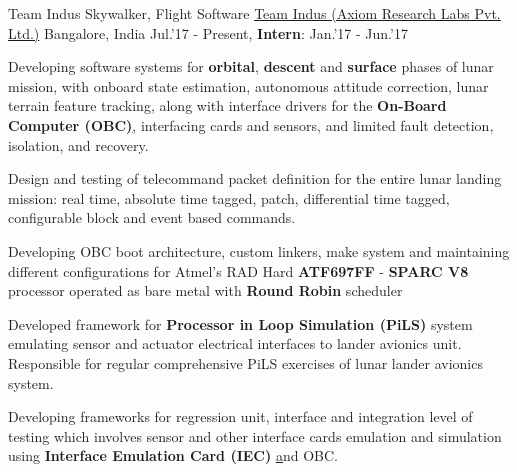 \begin{cventries}
	\cventry
	{Team Indus Skywalker, Flight Software}
	{\href{http://www.teamindus.in/}{Team Indus (Axiom Research Labs Pvt. Ltd.)}}
	{Bangalore, India}
	{Jul.'17 - Present, \textbf{Intern}: Jan.'17 - Jun.'17}
	{
		\begin{cvitems}
		\item{Developing software systems for \textbf{orbital}, \textbf{descent} and \textbf{surface} phases of lunar mission, with onboard state estimation, autonomous attitude correction, lunar terrain feature tracking, along with interface drivers for the \textbf{On-Board Computer (OBC)}\href{http://ww1.microchip.com/downloads/en/DeviceDoc/ATF697FF.pdf}, interfacing cards and sensors, and limited fault detection, isolation, and recovery.}
			\item{Design and testing of telecommand packet definition for the entire lunar landing mission: real time, absolute time tagged, patch, differential time tagged, configurable block and event based commands.}
			\item{Developing OBC boot architecture, custom linkers, make system and maintaining different configurations for Atmel's RAD Hard \textbf{ATF697FF} - \textbf{SPARC V8} processor operated as bare metal with \textbf{Round Robin} scheduler}
			\item{Developed framework for \textbf{Processor in Loop Simulation (PiLS)} system emulating sensor and actuator electrical interfaces to lander avionics unit. Responsible for regular comprehensive PiLS exercises of lunar lander avionics system.}
			\item{Developing frameworks for regression unit, interface and integration level of testing which involves sensor and other interface cards emulation and simulation using \textbf{Interface Emulation Card (IEC) }\href{http://zedboard.org/product/microzed/} and OBC.}
		\end{cvitems}
	}
\end{cventries}
